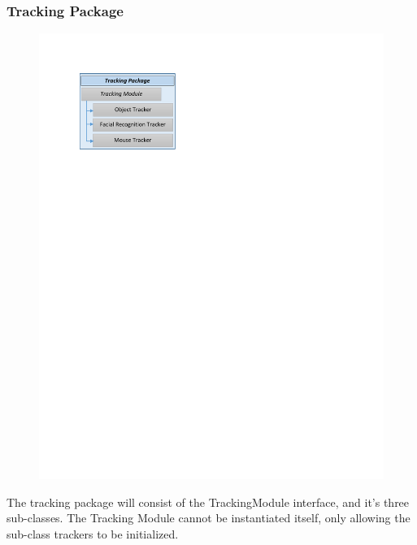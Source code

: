 \documentclass[titlepage]{article}
\begin{document}
\subsubsection{Tracking Package}
\begin{minipage}{\textwidth}
\begin{figure}
  \vspace{-20pt}
  \begin{center}
	\includegraphics{tracking_package.pdf}
  \end{center}
\end{figure}
The tracking package will consist of the TrackingModule interface, and it's three sub-classes. The Tracking Module cannot be instantiated itself, only allowing the sub-class trackers to be initialized.
\end{minipage}

\vspace{+100pt}
\end{document}
